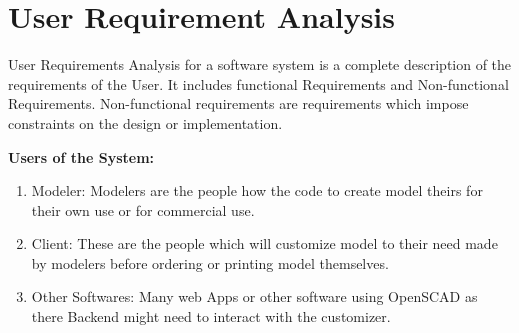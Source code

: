 \section{User Requirement Analysis}
User Requirements Analysis for a software system is a complete description of the requirements of the User. It includes functional Requirements
and Non-functional Requirements. Non-functional requirements are
requirements which impose constraints on the design or implementation.

 
{\bf Users of the System:}
    \begin{enumerate}
        \item Modeler: Modelers are the people how the code to create model theirs for their own use or for commercial use.
        \item Client: These are the people which will customize model to their need made by modelers before ordering or printing model themselves.
        \item Other Softwares: Many web Apps or other software using OpenSCAD as there Backend might need to interact with the customizer.
               
    \end{enumerate}

